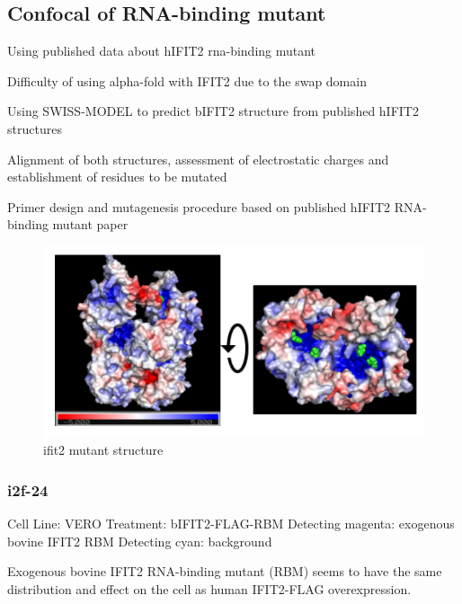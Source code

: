 \subsection{Confocal of RNA-binding mutant} \label{subsec:Confocal of RNA-binding mutant}
Using published data about hIFIT2 rna-binding mutant

Difficulty of using alpha-fold with IFIT2 due to the swap domain

Using SWISS-MODEL to predict bIFIT2 structure from published hIFIT2 structures

Alignment of both structures, assessment of electrostatic charges and establishment of residues to be mutated

Primer design and mutagenesis procedure based on published hIFIT2 RNA-binding mutant paper

\begin{figure}
    \centering
    \includegraphics[width=1\linewidth]{10. Chapter 5/Figs/05. IFIT2-RNA binding mutant/01. structure.png}
    \caption[ifit2 mutant structure]{ifit2 mutant structure}
    \label{fig:ifit2 mutant structure}
\end{figure}

\subsubsection{i2f-24}
Cell Line: VERO
Treatment: bIFIT2-FLAG-RBM
Detecting magenta: exogenous bovine IFIT2 RBM
Detecting cyan: background

Exogenous bovine IFIT2 RNA-binding mutant (RBM) seems to have the same distribution and effect on the cell as human IFIT2-FLAG overexpression.

